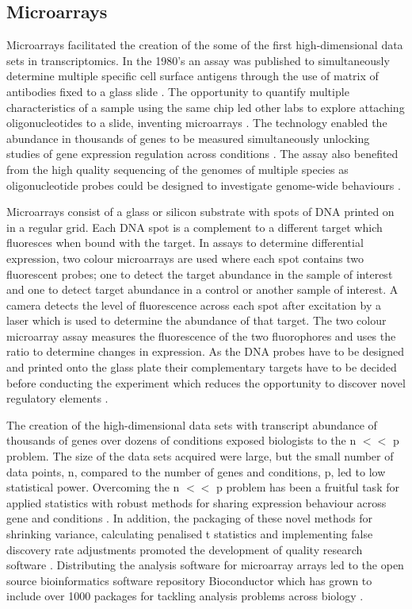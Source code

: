 \documentclass[../main.tex]{subfiles}
\begin{document}
\subsection{Microarrays}

Microarrays facilitated the creation of the some of the first high-dimensional data sets in transcriptomics.
In the 1980's an assay was published to simultaneously determine multiple specific cell surface antigens through the use of matrix of antibodies fixed to a glass slide \parencite{TseWen1983}.
The opportunity to quantify multiple characteristics of a sample using the same chip led other labs to explore attaching oligonucleotides to a slide, inventing microarrays \parencite{Schena1995}.
The technology enabled the abundance in thousands of genes to be measured simultaneously unlocking studies of gene expression regulation across conditions \parencite{Gasch2000}. 
The assay also benefited from the high quality sequencing of the genomes of multiple species as oligonucleotide probes could be designed to investigate genome-wide behaviours \parencite{Lander2001}.

Microarrays consist of a glass or silicon substrate with spots of DNA printed on in a regular grid. 
Each DNA spot is a complement to a different target which fluoresces when bound with the target. 
In assays to determine differential expression, two colour microarrays are used where each spot contains two fluorescent probes; one to detect the target abundance in the sample of interest and one to detect target abundance in a control or another sample of interest.
A camera detects the level of fluorescence across each spot after excitation by a laser which is used to determine the abundance of that target.  
The two colour microarray assay measures the fluorescence of the two fluorophores and uses the ratio to determine changes in expression.
As the DNA probes have to be designed and printed onto the glass plate their complementary targets have to be decided before conducting the experiment which reduces the opportunity to discover novel regulatory elements \parencite{Schena1995}.

The creation of the high-dimensional data sets with transcript abundance of thousands of genes over dozens of conditions exposed biologists to the n $<<$ p problem.
The size of the data sets acquired were large, but the small number of data points, n, compared to the number of genes and conditions, p, led to low statistical power.
Overcoming the n $<<$ p problem has been a fruitful task for applied statistics with robust methods for sharing expression behaviour across gene and conditions \parencite{Gui2005}.
In addition, the packaging of these novel methods for shrinking variance, calculating penalised t statistics and implementing false discovery rate adjustments promoted the development of quality research software \parencite{Smyth2005, Ritchie2015}.
Distributing the analysis software for microarray arrays led to the open source bioinformatics software repository Bioconductor which has grown to include over 1000 packages for tackling analysis problems across biology \parencite{Huber2015}.
\end{document}
